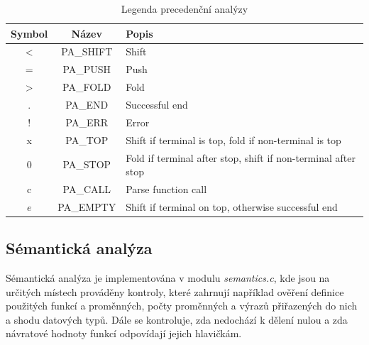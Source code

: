 \documentclass[a4paper, 12pt]{article} %
\begin{document}
                \begin{table}[h]
                    \centering
                    \begin{adjustbox}{width=0.72\textwidth}
                        \begin{tabular}{|c|c|l|}
                            \hline
                            \textbf{Symbol} & \textbf{Název} & \textbf{Popis}\\
                            \hline
                            \textless & PA\_SHIFT & Shift\\
                            \hline
                            = & PA\_PUSH & Push \\
                            \hline
                            \textgreater & PA\_FOLD & Fold \\
                            \hline
                            . & PA\_END & Successful end\\
                            \hline
                            ! & PA\_ERR  & Error\\
                            \hline
                            x & PA\_TOP &  Shift if terminal is top, fold if non-terminal is top\\
                            \hline
                            0 & PA\_STOP & Fold if terminal after stop, shift if non-terminal after stop\\
                            \hline
                            c & PA\_CALL & Parse function call\\
                            \hline
                            $e$ & PA\_EMPTY & Shift if terminal on top, otherwise successful end\\
                        \hline
                        \end{tabular}
                    \end{adjustbox}
                    \caption{Legenda precedenční analýzy}
                  \end{table}

        \subsection{Sémantická analýza}\label{semantics}
            Sémantická analýza je implementována v modulu \textit{semantics.c}, kde jsou
            na určitých místech prováděny kontroly, které zahrnují například
            ověření definice použitých funkcí a proměnných, počty proměnných a výrazů přiřazených
            do nich a shodu datových typů. Dále se kontroluje, zda nedochází k dělení nulou a zda
            návratové hodnoty funkcí odpovídají jejich hlavičkám.
\end{document}
